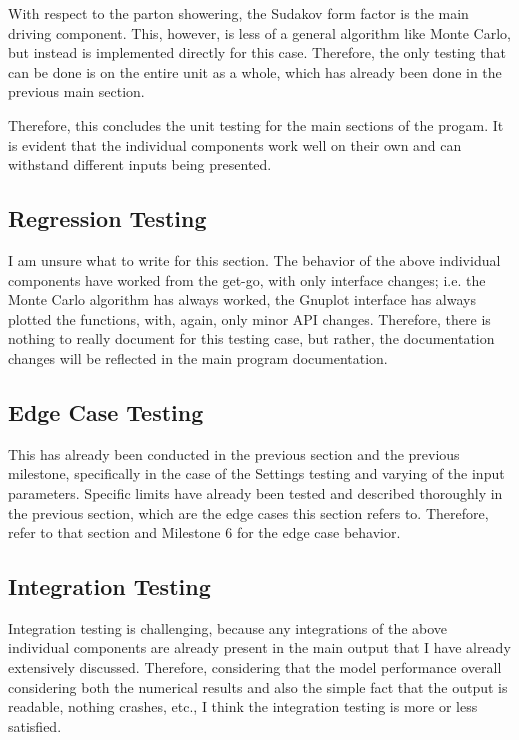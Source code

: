 With respect to the parton showering, the Sudakov form factor is the main driving component. This, however, is less of a general algorithm like Monte Carlo, but instead is implemented directly for this case. Therefore, the only testing that can be done is on the entire unit as a whole, which has already been done in the previous main section.

Therefore, this concludes the unit testing for the main sections of the progam. It is evident that the individual components work well on their own and can withstand different inputs being presented.




\subsection{Regression Testing}

I am unsure what to write for this section. The behavior of the above individual components have worked from the get-go, with only interface changes; i.e. the Monte Carlo algorithm has always worked, the Gnuplot interface has always plotted the functions, with, again, only minor API changes. Therefore, there is nothing to really document for this testing case, but rather, the documentation changes will be reflected in the main program documentation.



\subsection{Edge Case Testing}

This has already been conducted in the previous section and the previous milestone, specifically in the case of the Settings testing and varying of the input parameters. Specific limits have already been tested and described thoroughly in the previous section, which are the edge cases this section refers to. Therefore, refer to that section and Milestone 6 for the edge case behavior.



\subsection{Integration Testing}

Integration testing is challenging, because any integrations of the above individual components are already present in the main output that I have already extensively discussed. Therefore, considering that the model performance overall considering both the numerical results and also the simple fact that the output is readable, nothing crashes, etc., I think the integration testing is more or less satisfied.




